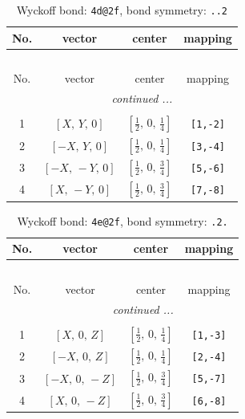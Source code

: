 \documentclass[fleqn,8pt]{jsarticle}
\begin{document}
\begin{longtable}{cccc}
\caption{Wyckoff bond: {\tt 4d@2f}, bond symmetry: {\tt ..2}}
 \\
 \hline \hline
No. & vector & center & mapping \\ \hline \endfirsthead

\multicolumn{3}{l}{\tablename\ \thetable{}} \\
 \hline \hline
No. & vector & center & mapping \\ \hline \endhead

 \hline \hline
\multicolumn{3}{r}{\footnotesize\it continued ...} \\ \endfoot

 \hline \hline
\multicolumn{3}{r}{} \\ \endlastfoot

1 & $\left[ X,\, Y,\, 0 \right]$ & $\left[ \frac{1}{2},\, 0,\, \frac{1}{4} \right]$ & {\tt [1,-2]} \\ \hline
2 & $\left[ - X,\, Y,\, 0 \right]$ & $\left[ \frac{1}{2},\, 0,\, \frac{1}{4} \right]$ & {\tt [3,-4]} \\ \hline
3 & $\left[ - X,\, - Y,\, 0 \right]$ & $\left[ \frac{1}{2},\, 0,\, \frac{3}{4} \right]$ & {\tt [5,-6]} \\ \hline
4 & $\left[ X,\, - Y,\, 0 \right]$ & $\left[ \frac{1}{2},\, 0,\, \frac{3}{4} \right]$ & {\tt [7,-8]} \\
\end{longtable}
\renewcommand{\arraystretch}{1.2}
\begin{longtable}{cccc}
\caption{Wyckoff bond: {\tt 4e@2f}, bond symmetry: {\tt .2.}}
 \\
 \hline \hline
No. & vector & center & mapping \\ \hline \endfirsthead

\multicolumn{3}{l}{\tablename\ \thetable{}} \\
 \hline \hline
No. & vector & center & mapping \\ \hline \endhead

 \hline \hline
\multicolumn{3}{r}{\footnotesize\it continued ...} \\ \endfoot

 \hline \hline
\multicolumn{3}{r}{} \\ \endlastfoot

1 & $\left[ X,\, 0,\, Z \right]$ & $\left[ \frac{1}{2},\, 0,\, \frac{1}{4} \right]$ & {\tt [1,-3]} \\ \hline
2 & $\left[ - X,\, 0,\, Z \right]$ & $\left[ \frac{1}{2},\, 0,\, \frac{1}{4} \right]$ & {\tt [2,-4]} \\ \hline
3 & $\left[ - X,\, 0,\, - Z \right]$ & $\left[ \frac{1}{2},\, 0,\, \frac{3}{4} \right]$ & {\tt [5,-7]} \\ \hline
4 & $\left[ X,\, 0,\, - Z \right]$ & $\left[ \frac{1}{2},\, 0,\, \frac{3}{4} \right]$ & {\tt [6,-8]} \\
\end{longtable}
\end{document}
